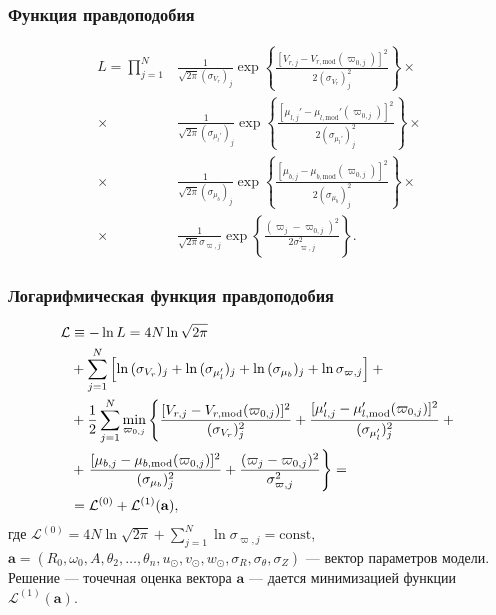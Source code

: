 \documentclass{beamer}
\begin{document}
\begin{frame}
\frametitle{Функция правдоподобия}
\vspace{-1em}
\begin{align}
  \nonumber
  L = \prod_{j = 1}^N & \frac{1}{\sqrt{2 \pi} (\sigma_{V_r})_j} \exp{\left\{ \frac{[ V_{r,j} - V_{r,\mathrm{mod}} (\varpi_{0,j}) ]^2}{2 (\sigma_{V_r})_j^2} \right\}} \times {}\\
  \nonumber
  {} \times {} & \frac{1}{\sqrt{2 \pi} (\sigma_{\mu_l'})_j} \exp{\left\{ \frac{[ \mu_{l,j}' - \mu_{l,\mathrm{mod}}' (\varpi_{0,j}) ]^2}{2 (\sigma_{\mu_l'})_j^2} \right\}} \times {}\\
  \nonumber
  {} \times {} & \frac{1}{\sqrt{2 \pi} (\sigma_{\mu_b})_j} \exp{\left\{ \frac{[ \mu_{b,j} - \mu_{b,\mathrm{mod}} (\varpi_{0,j}) ]^2}{2 (\sigma_{\mu_b})_j^2} \right\}} \times {}\\
  {} \times {} & \frac{1}{\sqrt{2 \pi} \sigma_{\varpi,j}} \exp{\left\{ \frac{(\varpi_j - \varpi_{0,j})^2}{2 \sigma_{\varpi,j}^2} \right\}}.
\end{align}
\end{frame}

\begin{frame}
\frametitle{Логарифмическая функция правдоподобия}
\vspace{-2em}
\begin{align}
  \nonumber
  \mathcal{L} &\equiv -\ln{L} = 4 N \ln{\sqrt{2 \pi}}\\
  \nonumber
  &+ \sum_{j=1}^N \left[ \ln{(\sigma_{V_r})_j} + \ln{(\sigma_{\mu_l'})_j} + \ln{(\sigma_{\mu_b})_j} + \ln{\sigma_{\varpi,j}} \right] + {}\\
  \nonumber
  &+ \frac{1}{2} \sum_{j=1}^N \min_{\varpi_{0,j}} \left\{ \frac{[ V_{r,j} - V_{r,\mathrm{mod}}(\varpi_{0,j}) ]^2}{(\sigma_{V_r})_j^2} + \frac{[ \mu_{l,j}' - \mu_{l,\mathrm{mod}}'(\varpi_{0,j}) ]^2}{(\sigma_{\mu_l'})_j^2} + {} \right.\\
  \nonumber
  &+ \left. \frac{[ \mu_{b,j} - \mu_{b,\mathrm{mod}}(\varpi_{0,j}) ]^2}{(\sigma_{\mu_b})_j^2} + \frac{( \varpi_j - \varpi_{0,j} )^2}{\sigma_{\varpi,j}^2} \vphantom{\frac{[ \mu_{l,j}' - \mu_{l,\mathrm{mod}}'(\varpi_{0,j}) ]^2}{(\sigma_{\mu_l'})_j^2}} \right\} = {}\\
  &= \mathcal{L}^{(0)} + \mathcal{L}^{(1)}(\mathbf{a}),
\end{align}
%
где $ \mathcal{L}^{(0)} = 4 N \ln{\sqrt{2 \pi}} + \sum_{j=1}^N \ln{\sigma_{\varpi,j}} = \mathrm{const} $, $ \mathbf{a} = (R_0, \omega_0, A, \theta_2, \ldots, \theta_n, u_\odot, v_\odot, w_\odot, \sigma_R, \sigma_\theta, \sigma_Z) $ --- вектор параметров модели. Решение --- точечная оценка вектора $ \mathbf{a} $ --- дается минимизацией функции $ \mathcal{L}^{(1)}(\mathbf{a}) $.
\end{frame}
\end{document}
